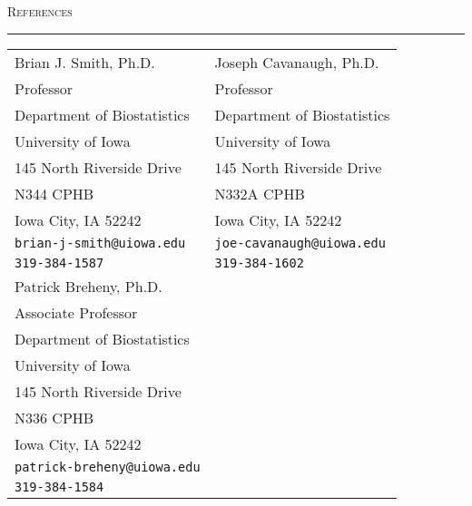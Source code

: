 \documentclass[a4paper]{article}
\begin{document}
\newpage


\begin{flushleft}
  \Large\textsc{References}
  \textcolor{usafagrey}{\rule[0.5\baselineskip]{\textwidth}{0.75pt}}
\end{flushleft}
\vspace{-\baselineskip}

\begin{tabular*}{0.9\textwidth}{@{\extracolsep{\fill}}ll}
  Brian J. Smith, Ph.D.              & Joseph Cavanaugh, Ph.D.\\
  Professor                          & Professor \\
  Department of Biostatistics        & Department of Biostatistics \\
  University of Iowa                 & University of Iowa \\
  145 North Riverside Drive          & 145 North Riverside Drive \\
  N344 CPHB                          & N332A CPHB \\
  Iowa City, IA 52242                & Iowa City, IA 52242 \\
  \texttt{brian-j-smith@uiowa.edu}   & \texttt{joe-cavanaugh@uiowa.edu} \\
  \texttt{319-384-1587}              & \texttt{319-384-1602} \\[10pt]
  Patrick Breheny, Ph.D.             \\
  Associate Professor                \\
  Department of Biostatistics        \\
  University of Iowa                 \\
  145 North Riverside Drive          \\
  N336 CPHB                          \\
  Iowa City, IA 52242                \\
  \texttt{patrick-breheny@uiowa.edu} \\
  \texttt{319-384-1584}
\end{tabular*}


\end{document}
